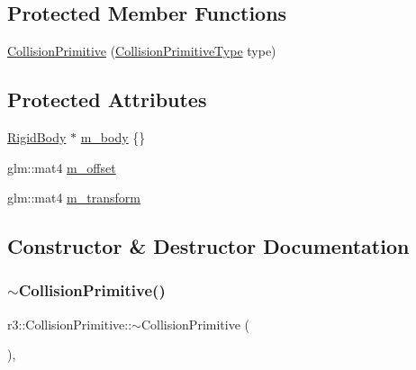 \subsection*{Protected Member Functions}
\begin{DoxyCompactItemize}
\item 
\mbox{\hyperlink{classr3_1_1_collision_primitive_a56f4cef84fcb4d92b0ced2ffcefdb22a}{Collision\+Primitive}} (\mbox{\hyperlink{namespacer3_a7079ec5e42c1a55140d3bc093d49e319}{Collision\+Primitive\+Type}} type)
\end{DoxyCompactItemize}
\subsection*{Protected Attributes}
\begin{DoxyCompactItemize}
\item 
\mbox{\hyperlink{classr3_1_1_rigid_body}{Rigid\+Body}} $\ast$ \mbox{\hyperlink{classr3_1_1_collision_primitive_a3ae500c9bd222ec42d86696702e746db}{m\+\_\+body}} \{\}
\item 
glm\+::mat4 \mbox{\hyperlink{classr3_1_1_collision_primitive_a15a51c2e72a8c5122a1031d6620a2901}{m\+\_\+offset}}
\item 
glm\+::mat4 \mbox{\hyperlink{classr3_1_1_collision_primitive_a0cb28517e7791b9836a5cac5d8550b13}{m\+\_\+transform}}
\end{DoxyCompactItemize}


\subsection{Constructor \& Destructor Documentation}
\mbox{\label{classr3_1_1_collision_primitive_adfa75f14067cb33a3f0049895a3db880}} 
\subsubsection{\texorpdfstring{$\sim$\+Collision\+Primitive()}{~CollisionPrimitive()}}
{\footnotesize\ttfamily r3\+::\+Collision\+Primitive\+::$\sim$\+Collision\+Primitive (\begin{DoxyParamCaption}{ }\end{DoxyParamCaption})\hspace{0.3cm}{\ttfamily [virtual]}, {\ttfamily [default]}}


